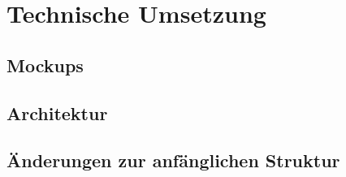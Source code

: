 
\chapter{Technische Umsetzung}

\section{Mockups}

\section{Architektur}

\section{Änderungen zur anfänglichen Struktur}